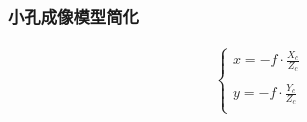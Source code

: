 \documentclass[aspectratio=43]{beamer}
\begin{document}
\begin{frame}
	\frametitle{小孔成像模型简化}
	\begin{figure}
		\begin{center}
		\end{center}	
	\end{figure}
	
	\begin{gather}
		\left\{ \begin{array}{c}
			x=-f\cdot \frac{X_c}{Z_c}\\
			\\
			y=-f\cdot \frac{Y_c}{Z_c}\\
		\end{array} \right. 	
	\end{gather}
\end{frame}
\end{document}
